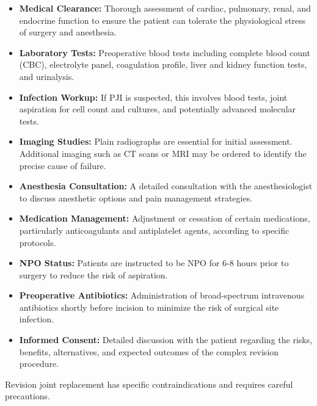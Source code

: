 \begin{itemize}
  \item \textbf{Medical Clearance:} Thorough assessment of cardiac, pulmonary, renal, and endocrine function to ensure the patient can tolerate the physiological stress of surgery and anesthesia.
  
  \item \textbf{Laboratory Tests:} Preoperative blood tests including complete blood count (CBC), electrolyte panel, coagulation profile, liver and kidney function tests, and urinalysis.
  
  \item \textbf{Infection Workup:} If PJI is suspected, this involves blood tests, joint aspiration for cell count and cultures, and potentially advanced molecular tests.
  
  \item \textbf{Imaging Studies:} Plain radiographs are essential for initial assessment. Additional imaging such as CT scans or MRI may be ordered to identify the precise cause of failure.
  
  \item \textbf{Anesthesia Consultation:} A detailed consultation with the anesthesiologist to discuss anesthetic options and pain management strategies.
  
  \item \textbf{Medication Management:} Adjustment or cessation of certain medications, particularly anticoagulants and antiplatelet agents, according to specific protocols.
  
  \item \textbf{NPO Status:} Patients are instructed to be NPO for 6-8 hours prior to surgery to reduce the risk of aspiration.
  
  \item \textbf{Preoperative Antibiotics:} Administration of broad-spectrum intravenous antibiotics shortly before incision to minimize the risk of surgical site infection.
  
  \item \textbf{Informed Consent:} Detailed discussion with the patient regarding the risks, benefits, alternatives, and expected outcomes of the complex revision procedure.
\end{itemize}

Revision joint replacement has specific contraindications and requires careful precautions.

